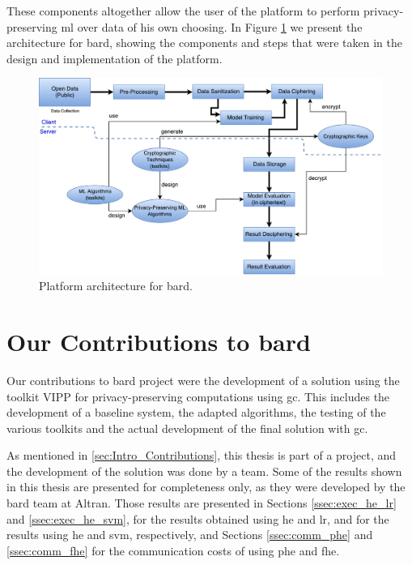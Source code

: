 These components altogether allow the user of the platform to perform privacy-preserving \ac{ml} over data of his own choosing.
In Figure \ref{fig:bard-architecture} we present the architecture for \ac{bard}, showing the components and steps that were taken in the design and implementation of the platform.

\begin{figure}[ht]
\centering
\label{fig:bard-architecture}
\includegraphics[width=1\textwidth]{images/BARDArchitecture.pdf}
\caption{Platform architecture for \acs{bard}.}
\end{figure}

\section{Our Contributions to \acs{bard}}
\label{sec:MyContributions}

Our contributions to \ac{bard} project were the development of a solution using the toolkit VIPP for privacy-preserving computations using \ac{gc}. This includes the development of a baseline system, the adapted algorithms, the testing of the various toolkits and the actual development of the final solution with \ac{gc}.

As mentioned in \ref{sec:Intro_Contributions}, this thesis is part of a project, and the development of the solution was done by a team. Some of the results shown in this thesis are presented for completeness only, as they were developed by the \ac{bard} team at Altran. Those results are presented in Sections \ref{ssec:exec_he_lr} and \ref{ssec:exec_he_svm}, for the results obtained using \ac{he} and \ac{lr}, and for the results using \ac{he} and \ac{svm}, respectively, and Sections \ref{ssec:comm_phe} and \ref{ssec:comm_fhe} for the communication costs of using \ac{phe} and \ac{fhe}. 
